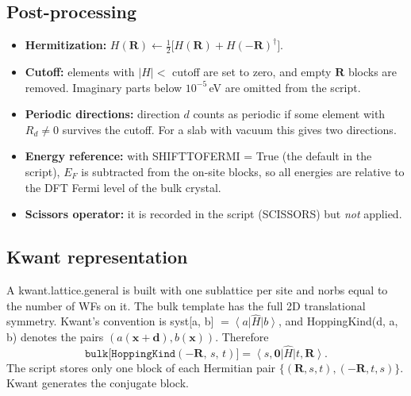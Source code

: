 \documentclass[11pt,a4paper]{article}
\newcommand{\code}[1]{{\ttfamily\def\_{\textunderscore\allowbreak}\def\slash{/\allowbreak}#1}}
\newcommand{\ket}[1]{\left|#1\right\rangle}
\newcommand{\bra}[1]{\left\langle#1\right|}
\begin{document}
\subsection{Post-processing}
\begin{itemize}[nosep]
  \item \textbf{Hermitization:} $H(\mathbf{R}) \leftarrow \tfrac12\big[H(\mathbf{R}) + H(-\mathbf{R})^\dagger\big]$.
  \item \textbf{Cutoff:} elements with $|H|<$ \code{cutoff} are set to zero, and empty
        $\mathbf{R}$ blocks are removed. Imaginary parts below $10^{-5}$\,eV are omitted
        from the script.
  \item \textbf{Periodic directions:} direction $d$ counts as periodic if some element with
        $R_d\neq 0$ survives the cutoff. For a slab with vacuum this gives two directions.
  \item \textbf{Energy reference:} with \code{SHIFT\_TO\_FERMI = True} (the default in
        the script), $E_F$ is subtracted from the on-site blocks, so all energies are
        relative to the DFT Fermi level of the bulk crystal.
  \item \textbf{Scissors operator:} it is recorded in the script (\code{SCISSORS}) but
        \emph{not} applied.
\end{itemize}

\subsection{Kwant representation}
A \code{kwant.lattice.general} is built with one sublattice per site and
\code{norbs} equal to the number of WFs on it. The bulk template has the full 2D
translational symmetry. Kwant's convention is \code{syst[a, b]} $=\bra{a}\hat H\ket{b}$,
and \code{HoppingKind(d, a, b)} denotes the pairs $(a(\mathbf{x}+\mathbf{d}), b(\mathbf{x}))$.
Therefore
\begin{equation}
  \texttt{bulk[HoppingKind}(-\mathbf{R},\, s,\, t)\texttt{]} = \bra{s,\mathbf{0}}\hat H\ket{t,\mathbf{R}}.
\end{equation}
The script stores only one block of each Hermitian pair $\{(\mathbf{R},s,t),(-\mathbf{R},t,s)\}$.
Kwant generates the conjugate block.
\end{document}
